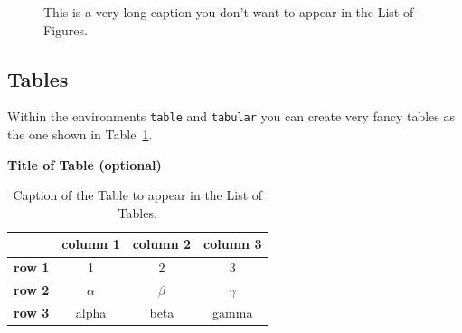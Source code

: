 \documentclass{Configuration_Files/PoliMi3i_thesis}
\begin{document}
\begin{figure}[H]
\centering
{}
\quad
{}
\caption[Shorter caption]{This is a very long caption you don't want to appear in the List of Figures.}
\label{fig:quadtree2}
\end{figure}


\subsection{Tables}
\label{subsec:tables}

Within the environments \texttt{table} and  \texttt{tabular} you can create very fancy tables as the one shown in
Table~\ref{table:example}.
\begin{table}[H]
\caption*{\textbf{Title of Table (optional)}}
\centering
\begin{tabular}{|p{3em} c c c |}
\hline
\rowcolor{bluepoli!40} %
& \textbf{column 1} & \textbf{column 2} & \textbf{column 3} \T\B \\
\hline \hline
\textbf{row 1} & 1 & 2 & 3 \T\B \\
\textbf{row 2} & $\alpha$ & $\beta$ & $\gamma$ \T\B\\
\textbf{row 3} & alpha & beta & gamma \B\\
\hline
\end{tabular}
\\[10pt]
\caption{Caption of the Table to appear in the List of Tables.}
\label{table:example}
\end{table}
\end{document}
